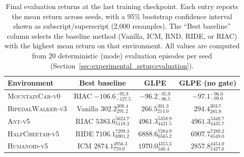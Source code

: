 \begin{table}[t]
\centering
\small
\begin{tabular}{lccc}
\hline
Environment & Best baseline & GLPE & GLPE (no gate) \\
\hline
\textsc{MountainCar-v0} & RIAC $-106.6_{-127.5}^{-95.9}$ & $-96.2_{-96.5}^{-95.9}$ & $-97.1_{-99.0}^{-96.0}$ \\
\textsc{BipedalWalker-v3} & Vanilla $302.2_{291.2}^{309.4}$ & $266.5_{214.0}^{301.3}$ & $294.4_{285.9}^{303.7}$ \\
\textsc{Ant-v5} & RIAC $5383.6_{5118.3}^{5624.7}$ & $4961.3_{4421.5}^{5358.9}$ & $4961.3_{4435.7}^{5348.7}$ \\
\textsc{HalfCheetah-v5} & RIDE $7106.1_{6901.2}^{7299.3}$ & $6888.6_{6565.2}^{7284.9}$ & $6907.7_{6548.0}^{7280.2}$ \\
\textsc{Humanoid-v5} & ICM $2874.1_{770.0}^{4956.3}$ & $1970.0_{546.4}^{4355.3}$ & $2857.8_{1427.6}^{4454.0}$ \\
\hline
\end{tabular}
\caption{
Final evaluation returns at the last training checkpoint.
Each entry reports the mean return across seeds, with a 95\% bootstrap confidence interval shown as subscript/superscript (2{,}000 resamples).
The ``Best baseline'' column selects the baseline method (Vanilla, ICM, RND, RIDE, or RIAC) with the highest mean return on that environment.
All values are computed from 20 deterministic (mode) evaluation episodes per seed (Section~\ref{sec:experimental_setup:evaluation}).
}
\label{tab:final_eval_summary}
\end{table}
